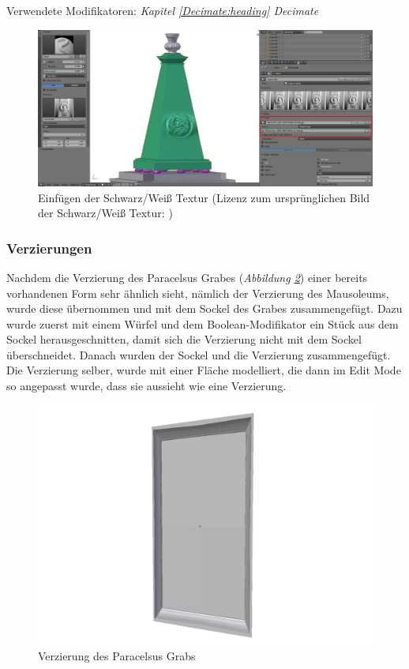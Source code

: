 Verwendete Modifikatoren: \textit{Kapitel \ref{Decimate:heading} \dq Decimate\dq}
\begin{figure}[H]
    \centering
    \includegraphics[width=.8\textwidth]{images/Paracelsus-Grab_Brush.png}
    \caption{Einfügen der Schwarz/Weiß Textur (Lizenz zum ursprünglichen Bild der Schwarz/Weiß Textur: \citep{paracelsusgrab:bild})}
    \label{Paracelsus_Grab:image4}
\end{figure}

\subsubsection{Verzierungen}
Nachdem die Verzierung des Paracelsus Grabes (\textit{Abbildung \ref{Paracelsus_Grab:image3}}) einer bereits vorhandenen Form sehr ähnlich sieht, nämlich der Verzierung des Mausoleums, wurde diese übernommen und
mit dem Sockel des Grabes zusammengefügt. Dazu wurde zuerst mit einem Würfel und dem Boolean-Modifikator ein Stück aus dem Sockel herausgeschnitten, damit
sich die Verzierung nicht mit dem Sockel überschneidet. Danach wurden der Sockel und die Verzierung zusammengefügt. Die Verzierung selber, wurde mit einer
Fläche modelliert, die dann im Edit Mode so angepasst wurde, dass sie aussieht wie eine Verzierung.
\begin{figure}[H]
    \centering
    \includegraphics[width=.8\textwidth]{images/Paracelsus-Grab_Verzierung.png}
    \caption{Verzierung des Paracelsus Grabs}
    \label{Paracelsus_Grab:image3}
\end{figure}

